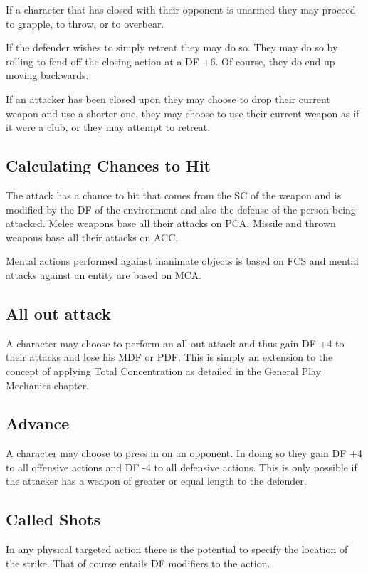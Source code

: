 If a character that has closed with their opponent is unarmed
they may proceed to grapple, to throw, or to overbear.

If the defender wishes to simply retreat they may do so. They
may do so by rolling to fend off the closing action at a DF +6.
Of course, they do end up moving backwards.

If an attacker has been closed upon they may choose to drop their
current weapon and use a shorter one, they may choose to use their
current weapon as if it were a club, or they may attempt to retreat.

\subsection{Calculating Chances to Hit}

The attack has a chance to hit that comes from the SC of the weapon and
is modified by the DF of the environment and also the defense of the
person being attacked. Melee
weapons base all their attacks on PCA. Missile and thrown weapons
base all their attacks on ACC.

Mental actions performed against inanimate objects is based on FCS
and mental attacks against an entity are based on MCA.

\subsection{All out attack}

A character may choose to perform an all out attack and thus gain
DF +4 to their attacks and lose his MDF or PDF. This is simply an
extension to the concept of applying Total Concentration as detailed
in the General Play Mechanics chapter.

\subsection{Advance}

A character may choose to press in on an opponent. In doing so
they gain DF +4 to all offensive actions and DF -4 to all defensive
actions. This is only possible if the attacker has a weapon of greater
or equal length to the defender.

\subsection{Called Shots}

In any physical targeted action there is the potential to specify the
location of the strike. That of course entails DF modifiers to the
action.

